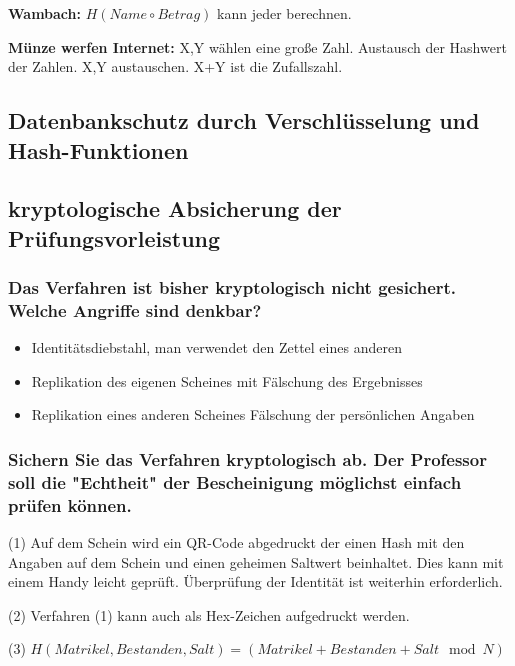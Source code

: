 \textbf{Wambach:}
$H(Name \circ Betrag)$ kann jeder berechnen.

\textbf{Münze werfen Internet:} X,Y wählen eine große Zahl.
Austausch der Hashwert der Zahlen.
X,Y austauschen.
X+Y ist die Zufallszahl.



\subsection{Datenbankschutz durch Verschlüsselung und Hash-Funktionen}

\lstset{language=SQL}




\subsection{kryptologische Absicherung der Prüfungsvorleistung}
\subsubsection{Das Verfahren ist bisher kryptologisch nicht gesichert. Welche Angriffe sind denkbar?}
\begin{itemize}
\item Identitätsdiebstahl, man verwendet den Zettel eines anderen
\item Replikation des eigenen Scheines mit Fälschung des Ergebnisses
\item Replikation eines anderen Scheines Fälschung der persönlichen Angaben
\end{itemize}

\subsubsection{Sichern Sie das Verfahren kryptologisch ab. 
               Der Professor soll die "Echtheit" der Bescheinigung möglichst einfach prüfen können.}
               
(1) Auf dem Schein wird ein QR-Code abgedruckt der einen Hash mit den Angaben auf dem Schein und einen geheimen Saltwert beinhaltet. Dies kann mit einem Handy leicht geprüft. Überprüfung der Identität ist weiterhin erforderlich.

(2) Verfahren (1) kann auch als Hex-Zeichen aufgedruckt werden.

(3) $H(Matrikel,Bestanden,Salt) = (Matrikel+Bestanden+Salt \mod N)$